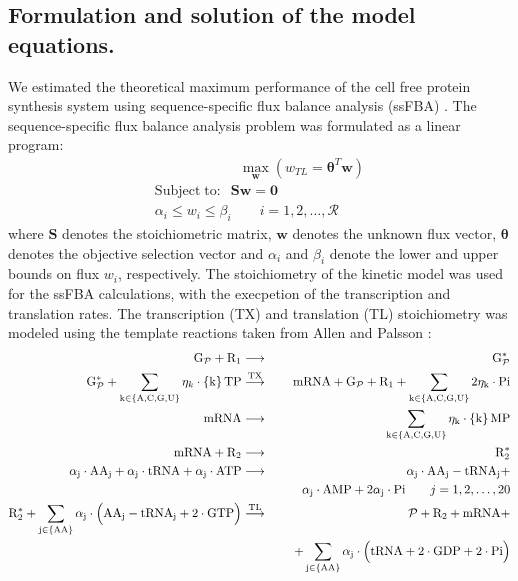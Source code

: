 \documentclass[journal=asbcd6,manuscript=article]{achemso}
\begin{document}
\subsection*{Formulation and solution of the model equations.}
We estimated the theoretical maximum performance of the cell free protein synthesis system using sequence-specific flux balance analysis (ssFBA) \cite{Allen:2003aa}.
The sequence-specific flux balance analysis problem was formulated as a linear program:
\begin{equation}
 \begin{multlined}
	\qquad \qquad \qquad \max_{\boldsymbol{w}}{} \! \left( w_{TL} = \mathbf{\boldsymbol{\theta}}^T \boldsymbol{w} \right) \\
	\mathrm{Subject \; to:}
	 \; \; \mathbf{S}\mathbf{w}=\mathbf{0} \\
\alpha_i \leq w_i \leq \beta_i  \qquad i=1,2,\hdots,\mathcal{R}
 \end{multlined}
\end{equation}
where $\mathbf{S}$ denotes the stoichiometric matrix, $\mathbf{w}$ denotes the unknown flux vector, $\boldsymbol{\theta}$ denotes the objective selection vector
and $\alpha_i$ and $\beta_i$ denote the lower and upper bounds on flux $w_{i}$, respectively.
The stoichiometry of the kinetic model was used for the ssFBA calculations, with the execpetion of the transcription and translation rates.
The transcription (TX) and translation (TL) stoichiometry was modeled using the template reactions taken from Allen and Palsson \cite{Allen:2003aa}:
\begin{eqnarray*}
\mathrm{{G}_{\mathcal{P}}}+\mathrm{{R}_{1}} &\longrightarrow& \mathrm{G_{\mathcal{P}}^{*}} \\
\mathrm{G_{\mathcal{P}}^{*}}+\sum_{\mathrm{k\in\left\{A,C,G,U\right\}}}\eta_{k}\cdot \mathrm{\left\{k\right\}TP} &\overset{\rm TX}{\longrightarrow}& \mathrm{mRNA}+\mathrm{G_{\mathcal{P}}}+\mathrm{R_{1}}+ \mathrm{\sum_{k\in\left\{A,C,G,U\right\}}2\eta_{k}\cdot Pi}\\
\mathrm{mRNA} &\longrightarrow& \mathrm{\sum_{k\in\left\{A,C,G,U\right\}}\eta_{k}\cdot \left\{k\right\}MP} \\
\mathrm{mRNA}+\mathrm{R_{2}} &\longrightarrow& \mathrm{R_{2}^{*}} \\
\mathrm{\alpha_{j}\cdot AA_{j}+\alpha_{j}\cdot tRNA+\alpha_{j}\cdot ATP} &\longrightarrow& \mathrm{\alpha_{j}\cdot AA_{j}-tRNA_{j}+}\\
&& \mathrm{\qquad \alpha_{j}\cdot AMP+2\alpha_{j}\cdot Pi} \qquad{j=1,2,\hdots,20}\\
\mathrm{R_{2}^{*}+\sum_{j\in\left\{AA\right\}}\alpha_{j}\cdot \Big(AA_{j}-tRNA_{j}+2\cdot GTP\Big)} &\stackrel{\rm TL}{\longrightarrow}& \mathcal{P}+\mathrm{R_{2}+mRNA}+\\
&& \mathrm{\quad +\sum_{j\in\left\{AA\right\}}\alpha_{j}\cdot\Big(tRNA+2\cdot GDP+2\cdot Pi\Big)}
\end{eqnarray*}
\end{document}

